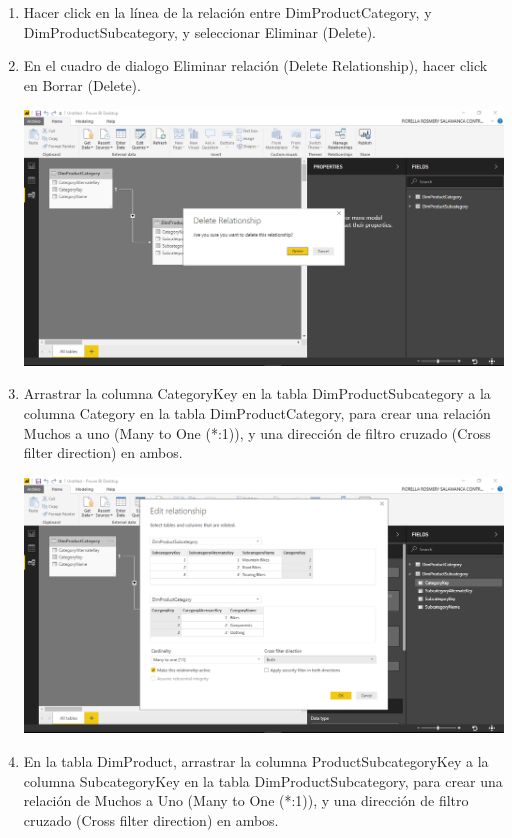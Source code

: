\begin{enumerate}[1.]
    \item Hacer click en la línea de la relación entre DimProductCategory, y DimProductSubcategory, y seleccionar Eliminar (Delete).
    \item En el cuadro de dialogo Eliminar relación (Delete Relationship), hacer click en Borrar (Delete).

	\begin{center}
	\includegraphics[width=17cm]{./Imagenes/Ejercicio1-Tarea2/6}
	\end{center}	

    \item Arrastrar la columna CategoryKey en la tabla DimProductSubcategory a la columna Category en la tabla DimProductCategory, para crear una relación Muchos a uno (Many to One (*:1)), y una dirección de filtro cruzado (Cross filter direction) en ambos.

	\begin{center}
	\includegraphics[width=17cm]{./Imagenes/Ejercicio1-Tarea2/7}
	\end{center}	

    \item En la tabla DimProduct, arrastrar la columna ProductSubcategoryKey a la columna SubcategoryKey en la tabla DimProductSubcategory, para crear una relación de Muchos a Uno (Many to One (*:1)), y una dirección de filtro cruzado (Cross filter direction) en ambos.


\end{enumerate}
